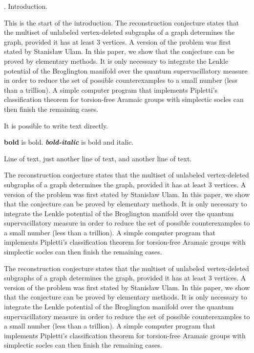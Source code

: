 
. Introduction.

This is the start of the introduction.
The reconstruction conjecture states that the multiset of unlabeled
vertex-deleted subgraphs of a graph determines the graph, provided it
has at least 3 vertices.  A version of the problem was first stated
by Stanis\l aw Ulam.  In this paper, we show that the conjecture can
be proved by elementary methods.  It is only necessary to integrate
the Lenkle potential of the Broglington manifold over the quantum
supervacillatory measure in order to reduce the set of possible
counterexamples to a small number (less than a trillion).  A simple
computer program that implements Pipletti's classification theorem
for torsion-free Aramaic groups with simplectic socles can then
finish the remaining cases.

\bigskip

It is possible to write text directly.

{\bf bold} is bold.
{\bf\it bold-italic} is bold and italic.

Line of text, 
just another line of text,
and another line of text.

The reconstruction conjecture states that the multiset of unlabeled
vertex-deleted subgraphs of a graph determines the graph, provided it
has at least 3 vertices.  A version of the problem was first stated
by Stanis\l aw Ulam.  In this paper, we show that the conjecture can
be proved by elementary methods.  It is only necessary to integrate
the Lenkle potential of the Broglington manifold over the quantum
supervacillatory measure in order to reduce the set of possible
counterexamples to a small number (less than a trillion).  A simple
computer program that implements Pipletti's classification theorem
for torsion-free Aramaic groups with simplectic socles can then
finish the remaining cases.

The reconstruction conjecture states that the multiset of unlabeled
vertex-deleted subgraphs of a graph determines the graph, provided it
has at least 3 vertices.  A version of the problem was first stated
by Stanis\l aw Ulam.  In this paper, we show that the conjecture can
be proved by elementary methods.  It is only necessary to integrate
the Lenkle potential of the Broglington manifold over the quantum
supervacillatory measure in order to reduce the set of possible
counterexamples to a small number (less than a trillion).  A simple
computer program that implements Pipletti's classification theorem
for torsion-free Aramaic groups with simplectic socles can then
finish the remaining cases.

